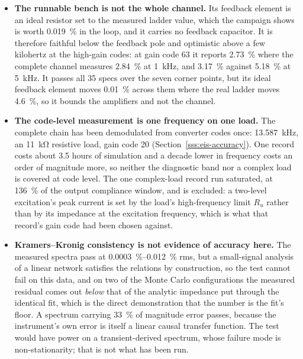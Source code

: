 \begin{itemize}[nosep]
  \item \textbf{The runnable bench is not the whole channel.} Its feedback
    element is an ideal resistor set to the measured ladder value, which the
    campaign shows is worth \SI{0.019}{\percent} in the loop, and it carries no
    feedback capacitor. It is therefore faithful below the feedback pole and
    optimistic above a few kilohertz at the high-gain codes: at gain code 63 it
    reports \SI{2.73}{\percent} where the complete channel measures
    \SI{2.84}{\percent} at \SI{1}{\kilo\hertz}, and \SI{3.17}{\percent} against
    \SI{5.18}{\percent} at \SI{5}{\kilo\hertz}. It passes all \num{35} specs over
    the seven corner points, but its ideal feedback element moves
    \SI{0.01}{\percent} across them where the real ladder moves
    \SI{4.6}{\percent}, so it bounds the amplifiers and not the channel.
  \item \textbf{The code-level measurement is one frequency on one load.} The
    complete chain has been demodulated from converter codes once:
    \SI{13.587}{\kilo\hertz}, an \SI{11}{\kilo\ohm} resistive load, gain code 20
    (Section~\ref{sss:eis-accuracy}). One record costs about \num{3.5} hours of
    simulation and a decade lower in frequency costs an order of magnitude more,
    so neither the diagnostic band nor a complex load is covered at code level.
    The one complex-load record run saturated, at \SI{136}{\percent} of the
    output compliance window, and is excluded: a two-level excitation's peak
    current is set by the load's high-frequency limit \(R_u\) rather than by its
    impedance at the excitation frequency, which is what that record's gain code
    had been chosen against.
  \item \textbf{Kramers--Kronig consistency is not evidence of accuracy here.}
    The measured spectra pass at \SIrange{0.0003}{0.012}{\percent} rms, but a
    small-signal analysis of a linear network satisfies the relations by
    construction, so the test cannot fail on this data, and on two of the
    Monte Carlo configurations the measured residual comes out \emph{below} that
    of the analytic impedance put through the identical fit, which is the direct
    demonstration that the number is the fit's floor. A spectrum carrying
    \SI{33}{\percent} of magnitude error passes, because the instrument's own
    error is itself a linear causal transfer function. The test would have power
    on a transient-derived spectrum, whose failure mode is non-stationarity;
    that is not what has been run.

\end{itemize}

